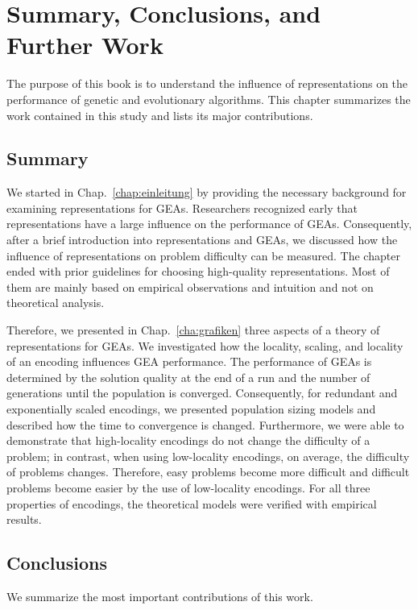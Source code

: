 

\chapter{Summary, Conclusions, and Further Work}
\label{chap:conclusions}
The purpose of this book is to understand  the influence of representations on the performance of genetic and evolutionary algorithms. 
This chapter summarizes the work contained in this study and lists its major contributions.

\section{Summary}

We  started in Chap.~\ref{chap:einleitung} by providing the necessary background for examining representations for  GEAs. Researchers recognized early that representations have a large influence on the performance of GEAs. Consequently, after a brief introduction into representations and GEAs, we discussed how the influence of representations on problem difficulty  can be measured. The chapter ended with prior guidelines for choosing high-quality  representations. Most of them are  mainly based on empirical observations and intuition and not on theoretical analysis.

Therefore, we presented in Chap.~\ref{cha:grafiken} three aspects of a theory of representations for  GEAs. We investigated how the locality, scaling, and locality of an encoding  influences GEA performance. The performance of GEAs is determined by the solution quality at the end of a run and the number of generations until the population is converged. Consequently, for redundant and exponentially scaled encodings, we presented population sizing models and described how the time to convergence is changed.
Furthermore, we were able to demonstrate that high-locality encodings do not change the difficulty of a problem; in contrast, when using low-locality encodings, on average, the difficulty of problems changes. Therefore,  easy problems become more difficult and difficult problems become easier by the use of low-locality encodings.
For all three properties of encodings, the theoretical models were verified with empirical results.


\section{Conclusions}
We  summarize the most important contributions of this work.

